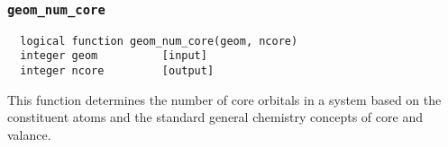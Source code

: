 \subsubsection{{\tt geom\_num\_core}}
\begin{verbatim}
  logical function geom_num_core(geom, ncore)
  integer geom          [input]
  integer ncore         [output]
\end{verbatim}
This function determines the number of core orbitals in a system based on the
constituent atoms and the standard general chemistry concepts of core and
valance.


